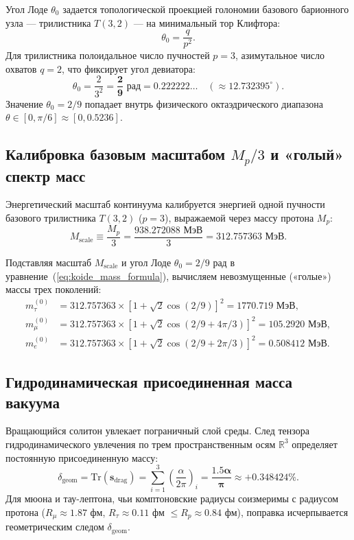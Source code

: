 \documentclass[11pt,a4paper]{article}
\theoremstyle{definition}
\theoremstyle{remark}
\begin{document}
Угол Лоде $\theta_0$ задается топологической проекцией голономии базового барионного узла --- трилистника $T(3,2)$ --- на минимальный тор Клифтора:
\begin{equation}
    \theta_0 = \frac{q}{p^2}.
    \label{eq:lode_projection}
\end{equation}
Для трилистника полоидальное число пучностей $p=3$, азимутальное число охватов $q=2$, что фиксирует угол девиатора:
\begin{equation}
    \theta_0 = \frac{2}{3^2} = \boldsymbol{\frac{2}{9}\text{ рад}} = 0.222222\dots \quad (\approx 12.732395^\circ).
\end{equation}
Значение $\theta_0 = 2/9$ попадает внутрь физического октаэдрического диапазона $\theta \in [0, \pi/6] \approx [0, 0.5236]$.

\subsection{Калибровка базовым масштабом $M_p/3$ и «голый» спектр масс}
Энергетический масштаб континуума калибруется энергией одной пучности базового трилистника $T(3,2)$ ($p=3$), выражаемой через массу протона $M_p$:
\begin{equation}
    M_{\mathrm{scale}} \equiv \frac{M_p}{3} = \frac{938.272088\text{ МэВ}}{3} = 312.757363\text{ МэВ}.
\end{equation}

Подставляя масштаб $M_{\mathrm{scale}}$ и угол Лоде $\theta_0 = 2/9$ рад в уравнение~(\ref{eq:koide_mass_formula}), вычисляем невозмущенные («голые») массы трех поколений:
\begin{align}
    m_\tau^{(0)} &= 312.757363 \times \left[ 1 + \sqrt{2} \cos(2/9) \right]^2 = 1770.719\text{ МэВ}, \\
    m_\mu^{(0)}  &= 312.757363 \times \left[ 1 + \sqrt{2} \cos(2/9 + 4\pi/3) \right]^2 = 105.2920\text{ МэВ}, \\
    m_e^{(0)}    &= 312.757363 \times \left[ 1 + \sqrt{2} \cos(2/9 + 2\pi/3) \right]^2 = 0.508412\text{ МэВ}.
\end{align}

\subsection{Гидродинамическая присоединенная масса вакуума}
Вращающийся солитон увлекает пограничный слой среды. След тензора гидродинамического увлечения по трем пространственным осям $\mathbb{R}^3$ определяет постоянную присоединенную массу:
\begin{equation}
    \delta_{\mathrm{geom}} = \mathrm{Tr}(\mathbf{s}_{\mathrm{drag}}) = \sum_{i=1}^3 \left( \frac{\alpha}{2\pi} \right)_i = \boldsymbol{\frac{1.5\alpha}{\pi}} \approx \mathbf{+0.348424\%}.
    \label{eq:delta_geom}
\end{equation}
Для мюона и тау-лептона, чьи комптоновские радиусы соизмеримы с радиусом протона ($R_\mu \approx 1.87$ фм, $R_\tau \approx 0.11$ фм $\le R_p \approx 0.84$ фм), поправка исчерпывается геометрическим следом $\delta_{\mathrm{geom}}$.
\end{document}
